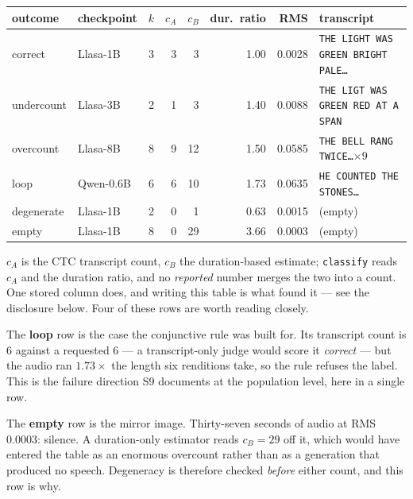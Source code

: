 \documentclass[11pt]{article}
\begin{document}
\begin{center}
{\footnotesize
\begin{tabular}{@{}llrrrrrl@{}}
\toprule
outcome & checkpoint & $k$ & $c_A$ & $c_B$ & dur.\ ratio & RMS & transcript \\
\midrule
correct    & Llasa-1B & 3 & 3 & 3  & 1.00 & 0.0028 & \texttt{THE LIGHT WAS GREEN BRIGHT PALE\ldots} \\
undercount & Llasa-3B & 2 & 1 & 3  & 1.40 & 0.0088 & \texttt{THE LIGT WAS GREEN RED AT A SPAN} \\
overcount  & Llasa-8B & 8 & 9 & 12 & 1.50 & 0.0585 & \texttt{THE BELL RANG TWICE\ldots}$\times 9$ \\
loop       & Qwen-0.6B & 6 & 6 & 10 & 1.73 & 0.0635 & \texttt{HE COUNTED THE STONES\ldots} \\
degenerate & Llasa-1B & 2 & 0 & 1  & 0.63 & 0.0015 & (empty) \\
empty      & Llasa-1B & 8 & 0 & 29 & 3.66 & 0.0003 & (empty) \\
\bottomrule
\end{tabular}}
\end{center}

\noindent $c_A$ is the CTC transcript count, $c_B$ the duration-based estimate;
\texttt{classify} reads $c_A$ and the duration ratio, and no \emph{reported}
number merges the two into a count. One stored column does, and writing this
table is what found it --- see the disclosure below. Four of these rows are
worth reading closely.

The \textbf{loop} row is the case the conjunctive rule was built for. Its
transcript count is $6$ against a requested $6$ --- a transcript-only judge
would score it \emph{correct} --- but the audio ran $1.73\times$ the length six
renditions take, so the rule refuses the label. This is the failure direction
S9 documents at the population level, here in a single row.

The \textbf{empty} row is the mirror image. Thirty-seven seconds of audio at RMS
$0.0003$: silence. A duration-only estimator reads $c_B{=}29$ off it, which
would have entered the table as an enormous overcount rather than as a
generation that produced no speech. Degeneracy is therefore checked \emph{before}
either count, and this row is why.
\end{document}
